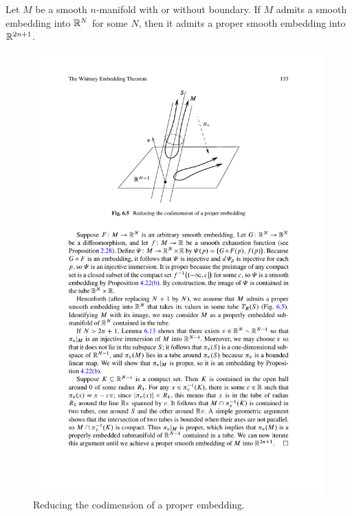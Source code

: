 \begin{lemma}\label{reduce codim embedd}
Let $M$ be a smooth $n$-manifold with or without boundary. If $M$ admits a smooth embedding into $\mathbb{R}^N$ for some $N$, then it admits a proper smooth embedding into $\mathbb{R}^{2n+1}$.
\end{lemma}
\begin{figure}[h]
\centering
\includegraphics{pictures/Whitney}
\caption{Reducing the codimension of a proper embedding.}
\end{figure}
